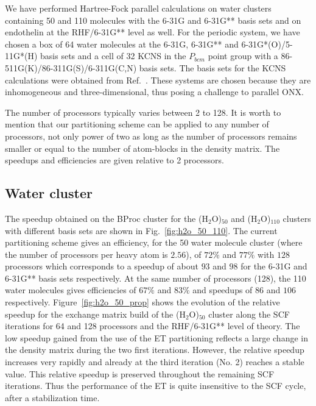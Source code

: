 \documentclass[prl,twocolumn,showpacs,twocolumngrid,superbib]{revtex4}
\begin{document}
 We have performed Hartree-Fock parallel calculations on 
 water clusters containing 50 and 110 molecules with 
 the 6-31G and 6-31G** basis sets and on endothelin at the RHF/6-31G** level as well.
 For the periodic system, we have chosen a box of 64 water molecules
 at the 6-31G, 6-31G** and 6-31G*(O)/5-11G*(H) basis sets
 and a cell of 32 KCNS in the $P_{bcm}$ point group with
 a 86-511G(K)/86-311G(S)/6-311G(C,N) basis sets.
 The basis sets for the KCNS calculations were obtained from 
 Ref.~\cite{CrystalLib}.
 These systems are chosen because
 they are inhomogeneous and three-dimensional, thus posing a challenge
 to parallel ONX.

 The number of processors typically varies between 2 to 128. 
 It is worth to mention that our partitioning scheme can be 
 applied to any number of processors, not only power of two 
 as long as the number of processors remains smaller or equal 
 to the number of atom-blocks in the density matrix.
 The speedups and efficiencies are given relative to 2 processors.

\subsection{Water cluster}

 The speedup obtained on the BProc cluster for the (H$_2$O)$_{50}$ 
 and (H$_2$O)$_{110}$ clusters 
 with different basis sets are shown in Fig.~\ref{fig:h2o_50_110}. 
 The current partitioning scheme
 gives an efficiency, for the 50 water molecule cluster 
 (where the number of processors per heavy atom is $2.56$), 
 of $72\%$ and $77\%$ with $128$ processors which 
 corresponds to a speedup of about $93$ and $98$ for 
 the 6-31G and 6-31G** basis sets respectively.  
 At the same number of processors (128), the 110 water molecules gives efficiencies of
 $67\%$ and $83\%$ and speedups of $86$ and $106$ respectively.
 Figure~\ref{fig:h2o_50_prop} shows the evolution of the relative speedup for
 the exchange matrix build of
 the (H$_2$O)$_{50}$ cluster along the SCF iterations for 
 64 and 128 processors and the RHF/6-31G** level of theory. 
 The low speedup gained from the use of the ET partitioning  
 reflects a large change in the density matrix during the two first 
 iterations. However, the relative speedup increases very 
 rapidly and already at the third iteration (No. 2) reaches a stable value.
 This relative speedup is preserved throughout the remaining SCF iterations.
 Thus the performance of the ET is quite insensitive to the SCF cycle, after
 a stabilization time.
\end{document}
